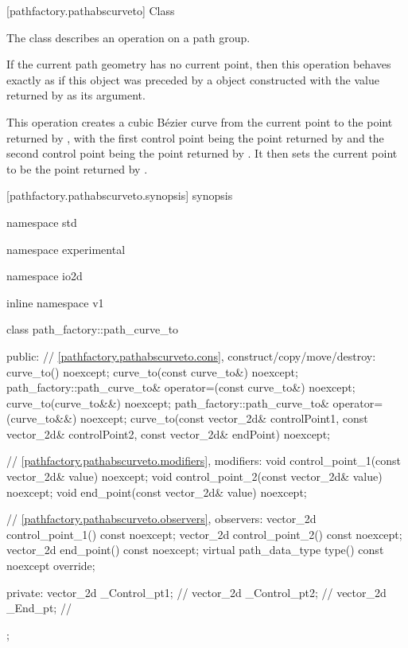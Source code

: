  [pathfactory.pathabscurveto] {Class }

\pnum
{}
The class  describes an operation on a path group.

\pnum
If the current path geometry has no current point, then this operation behaves exactly as if this object was preceded by a  object constructed with the value returned by  as its argument.

\pnum
This operation creates a cubic B\'ezier curve from the current point to the point returned by , with the first control point being the point returned by  and the second control point being the point returned by . It then sets the current point to be the point returned by .

 [pathfactory.pathabscurveto.synopsis] { synopsis}

\begin{codeblock}
namespace std { namespace experimental { namespace io2d { inline namespace v1 {
  class path_factory::path_curve_to {
  public:
    // \ref{pathfactory.pathabscurveto.cons}, construct/copy/move/destroy:
    curve_to() noexcept;
    curve_to(const curve_to&) noexcept;
    path_factory::path_curve_to& operator=(const curve_to&) noexcept;
    curve_to(curve_to&&) noexcept;
    path_factory::path_curve_to& operator=(curve_to&&) noexcept;
    curve_to(const vector_2d& controlPoint1, const vector_2d& controlPoint2,
      const vector_2d& endPoint) noexcept;

    // \ref{pathfactory.pathabscurveto.modifiers}, modifiers:
    void control_point_1(const vector_2d& value) noexcept;
    void control_point_2(const vector_2d& value) noexcept;
    void end_point(const vector_2d& value) noexcept;


    // \ref{pathfactory.pathabscurveto.observers}, observers:
    vector_2d control_point_1() const noexcept;
    vector_2d control_point_2() const noexcept;
    vector_2d end_point() const noexcept;
    virtual path_data_type type() const noexcept override;
    
  private:
    vector_2d _Control_pt1; // \expos
    vector_2d _Control_pt2; // \expos
    vector_2d _End_pt;      // \expos
  };
} } } }
\end{codeblock}

